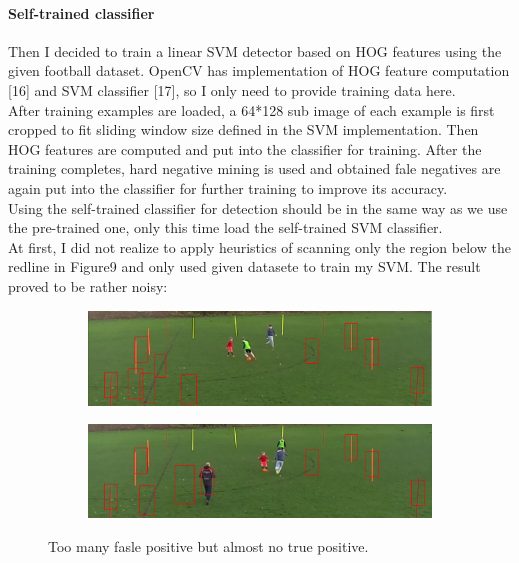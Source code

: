 \documentclass{article}
\begin{document}
\paragraph{Self-trained classifier}
Then I decided to train a linear SVM detector based on HOG features using the given football dataset. OpenCV has implementation of HOG feature computation [16] and SVM classifier [17], so I only need to provide training data here. \\
After training examples are loaded, a 64*128 sub image of each example is first cropped to fit sliding window size defined in the SVM implementation. Then HOG features are computed and put into the classifier for training. After the training completes, hard negative mining is used and obtained fale negatives are again put into the classifier for further training to improve its accuracy.\\
Using the self-trained classifier for detection should be in the same way as we use the pre-trained one, only this time load the self-trained SVM classifier.\\
At first, I did not realize to apply heuristics of scanning only the region below the redline in Figure9 and only used given datasete to train my SVM. The result proved to be rather noisy:
\begin{figure}[h!]
  \begin{subfigure}[b]{\linewidth}
  \centering
    \includegraphics[scale=0.2]{report/pic/3/selfHOG_1stround_2.png} 
  \end{subfigure}
  \begin{subfigure}[b]{\linewidth}
  \centering
    \includegraphics[scale=0.2]{report/pic/3/selfHOG_1stround_1.png} 
  \end{subfigure}
  \caption{Too many fasle positive but almost no true positive.}
\end{figure}
\end{document}
